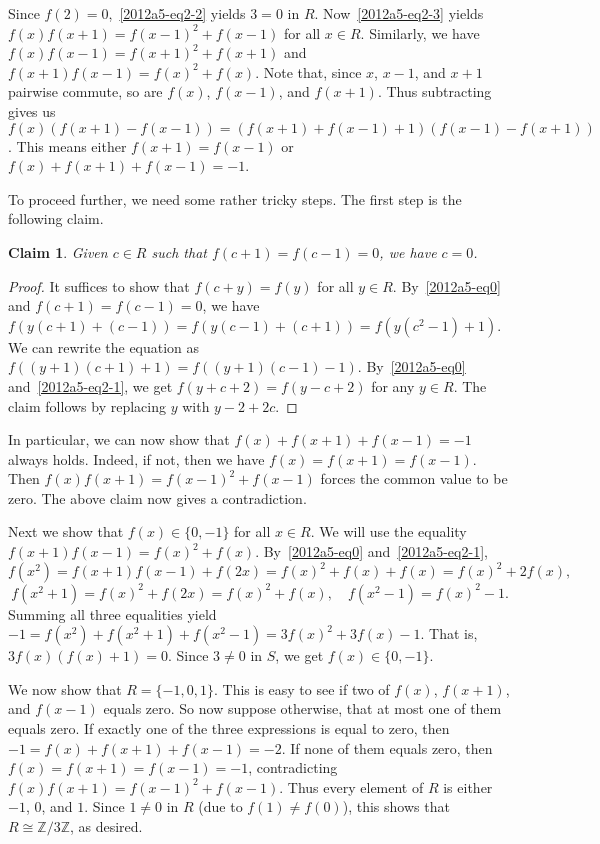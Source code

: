 \documentclass{article}
\newcommand{\Z}{\mathbb{Z}}
\newtheorem*{claim}{Claim}
\begin{document}
Since $f(2) = 0$,~\eqref{2012a5-eq2-2} yields $3 = 0$ in $R$.
Now~\eqref{2012a5-eq2-3} yields $f(x) f(x + 1) = f(x - 1)^2 + f(x - 1)$ for all $x \in R$.
Similarly, we have $f(x) f(x - 1) = f(x + 1)^2 + f(x + 1)$ and $f(x + 1) f(x - 1) = f(x)^2 + f(x)$.
Note that, since $x$, $x - 1$, and $x + 1$ pairwise commute, so are $f(x)$, $f(x - 1)$, and $f(x + 1)$.
Thus subtracting gives us $f(x) (f(x + 1) - f(x - 1)) = (f(x + 1) + f(x - 1) + 1)(f(x - 1) - f(x + 1))$.
This means either $f(x + 1) = f(x - 1)$ or $f(x) + f(x + 1) + f(x - 1) = -1$.

To proceed further, we need some rather tricky steps.
The first step is the following claim.

\begin{claim}
Given $c \in R$ such that $f(c + 1) = f(c - 1) = 0$, we have $c = 0$.
\end{claim}
\begin{proof}
It suffices to show that $f(c + y) = f(y)$ for all $y \in R$.
By~\eqref{2012a5-eq0} and $f(c + 1) = f(c - 1) = 0$, we have $f(y(c + 1) + (c - 1)) = f(y(c - 1) + (c + 1)) = f(y(c^2 - 1) + 1)$.
We can rewrite the equation as $f((y + 1)(c + 1) + 1) = f((y + 1)(c - 1) - 1)$.
By~\eqref{2012a5-eq0} and~\eqref{2012a5-eq2-1}, we get $f(y + c + 2) = f(y - c + 2)$ for any $y \in R$.
The claim follows by replacing $y$ with $y - 2 + 2c$.
\end{proof}

In particular, we can now show that $f(x) + f(x + 1) + f(x - 1) = -1$ always holds.
Indeed, if not, then we have $f(x) = f(x + 1) = f(x - 1)$.
Then $f(x) f(x + 1) = f(x - 1)^2 + f(x - 1)$ forces the common value to be zero.
The above claim now gives a contradiction.

Next we show that $f(x) \in \{0, -1\}$ for all $x \in R$.
We will use the equality $f(x + 1) f(x - 1) = f(x)^2 + f(x)$.
By~\eqref{2012a5-eq0} and~\eqref{2012a5-eq2-1},
\[ f(x^2) = f(x + 1) f(x - 1) + f(2x) = f(x)^2 + f(x) + f(x) = f(x)^2 + 2 f(x), \]
\[ f(x^2 + 1) = f(x)^2 + f(2x) = f(x)^2 + f(x), \quad f(x^2 - 1) = f(x)^2 - 1. \]
Summing all three equalities yield $-1 = f(x^2) + f(x^2 + 1) + f(x^2 - 1) = 3 f(x)^2 + 3 f(x) - 1$.
That is, $3 f(x) (f(x) + 1) = 0$.
Since $3 \neq 0$ in $S$, we get $f(x) \in \{0, -1\}$.

We now show that $R = \{-1, 0, 1\}$.
This is easy to see if two of $f(x)$, $f(x + 1)$, and $f(x - 1)$ equals zero.
So now suppose otherwise, that at most one of them equals zero.
If exactly one of the three expressions is equal to zero, then $-1 = f(x) + f(x + 1) + f(x - 1) = -2$.
If none of them equals zero, then $f(x) = f(x + 1) = f(x - 1) = -1$, contradicting $f(x) f(x + 1) = f(x - 1)^2 + f(x - 1)$.
Thus every element of $R$ is either $-1$, $0$, and $1$.
Since $1 \neq 0$ in $R$ (due to $f(1) \neq f(0)$), this shows that $R \cong \Z/3\Z$, as desired.
\end{document}
